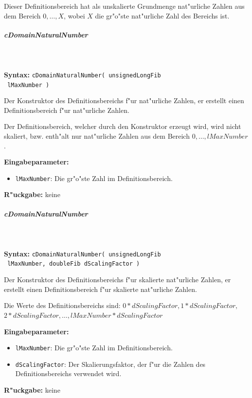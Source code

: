 Dieser Definitionsbereich hat als unskalierte Grundmenge nat"urliche Zahlen aus dem Bereich $0, \ldots, X$, wobei $X$ die gr"o"ste nat"urliche Zahl des Bereichs ist.


\subparagraph{cDomainNaturalNumber}

\ \\\\\noindent
\textbf{Syntax:} \verb|cDomainNaturalNumber( unsignedLongFib| \\\verb| lMaxNumber )|

\bigskip\noindent
Der Konstruktor des Definitionsbereichs f"ur nat"urliche Zahlen, er erstellt einen Definitionsbereich f"ur nat"urliche Zahlen.

Der Definitionsbereich, welcher durch den Konstruktor erzeugt wird, wird nicht skaliert, bzw. enth"alt nur nat"urliche Zahlen aus dem Bereich $0, \ldots , lMaxNumber$.

\bigskip\noindent
\textbf{Eingabeparameter:}
\begin{itemize}
 \item \verb|lMaxNumber|: Die gr"o"ste Zahl im Definitionsbereich.
\end{itemize}

\bigskip\noindent
\textbf{R"uckgabe:} keine


\subparagraph{cDomainNaturalNumber}

\ \\\\\noindent
\textbf{Syntax:} \verb|cDomainNaturalNumber( unsignedLongFib| \\\verb| lMaxNumber, doubleFib dScalingFactor )|

\bigskip\noindent
Der Konstruktor des Definitionsbereichs f"ur skalierte nat"urliche Zahlen, er erstellt einen Definitionsbereich f"ur skalierte nat"urliche Zahlen.

\bigskip\noindent
Die Werte des Definitionsbereichs sind: $0*dScalingFactor, 1*dScalingFactor,$\\ $2*dScalingFactor, \ldots , lMaxNumber*dScalingFactor$

\bigskip\noindent
\textbf{Eingabeparameter:}
\begin{itemize}
 \item \verb|lMaxNumber|: Die gr"o"ste Zahl im Definitionsbereich.
 \item \verb|dScalingFactor|: Der Skalierungsfaktor, der f"ur die Zahlen des Definitionsbereichs verwendet wird.
\end{itemize}

\bigskip\noindent
\textbf{R"uckgabe:} keine



